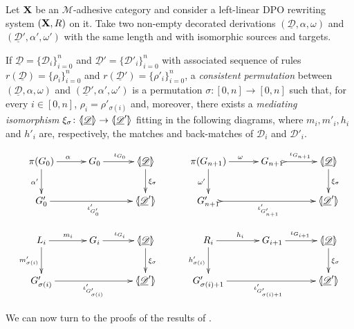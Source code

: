 \documentclass[a4paper,UKenglish,cleveref,pdftex,thm-restate,numberwithinsect,anonymous]{lipics}
\def\R{\mathsf{R}}
\def\X{\textbf {\textup{X}}}
\def\G{\textbf {\textup{G}}}
\newcommand{\dder}[1]{\mathscr{#1}}
\newcommand{\der}[1]{\underline{\dder{#1}}}
\newcommand{\lpro}{\langle \hspace{-1.85pt}[}
\newcommand{\rpro}{]\hspace{-1.85pt}\rangle}
\newcommand{\tpro}[1]{\lpro \der{#1}\rpro}
\begin{document}
\begin{definition}
	\label{def:permcon}
	Let $\X$ be an $\mathcal{M}$-adhesive category and consider a
	left-linear DPO rewriting system $(\X, \R)$ on it.  Take two
	non-empty decorated derivations $(\der{D}, \alpha, \omega)$ and
	$(\der{D}', \alpha', \omega')$ with the same length and with
	isomorphic sources and targets.
	
	If $\der{D}=\{\dder{D}_i\}_{i=0}^n$ and
	$\der{D}'=\{\dder{D}'_i\}_{i=0}^n$ with associated sequence of rules
	$r(\der{D})=\{\rho_i\}_{i=0}^n$ and
	$r(\der{D}')=\{\rho'_i\}_{i=0}^n$, a \emph{consistent permutation}
	between $(\der{D}, \alpha, \omega)$ and
	$(\der{D}', \alpha', \omega')$ is a permutation
	$\sigma\colon [0,n]\to [0,n]$ such that, for every $i\in [0,n]$,
	$\rho_i=\rho'_{\sigma(i)}$ and, moreover, there exists a
	\emph{mediating isomorphism}
	$\xi_\sigma\colon \tpro{D} \to \lpro \der{D}' \rpro$ fitting in the
	following diagrams, where $m_i, m'_i, h_i$ and $h'_i$ are,
	respectively, the matches and back-matches of $\dder{D}_i$ and
	$\dder{D}'_i$.
	
	\[
	\xymatrix@C=30pt{\pi(G_0)\ar[r]^{\alpha} \ar[d]_{\alpha'} & G_0
		\ar[r]^{\iota_{G_0}} &\tpro{D} \ar[d]^{\xi_\sigma}& \pi(G_{n+1})
		\ar[r]^{\omega} \ar[d]_{\omega'} & G_{n+1}
		\ar@{>->}[r]^{\iota_{G_{n+1}}} &\tpro{D} \ar[d]^{\xi_\sigma}\\
		G'_0 \ar[rr]_{\iota'_{G'_0}} & &\lpro \der{D}' \rpro& G'_{n+1}
		\ar@{>->}[rr]_{\iota'_{G'_{n+1}}} & &\lpro \der{D}' \rpro\\L_i
		\ar[r]^{m_i} \ar[d]_{m'_{\sigma(i)}}& G_i \ar[r]^{\iota_{G_i}}
		&\tpro{D} \ar[d]^{\xi_\sigma} & R_i \ar[r]^{h_i}
		\ar[d]_{h'_{\sigma(i)}}& G_{i+1} \ar[r]^{\iota_{G_{i+1}}}
		&\tpro{D} \ar[d]^{\xi_\sigma} \\G'_{\sigma(i)}
		\ar[rr]_{\iota'_{G'_{\sigma(i)}}}&& \lpro \der{D}' \rpro&
		G'_{\sigma(i)+1} \ar[rr]_{\iota'_{G'_{\sigma(i)+1}}}&& \lpro
		\der{D}' \rpro}
	\]
\end{definition}
We can now turn to the proofs of the results of .

\lemIndepGlobalLeft*
\label{lemIndepGlobalLeft-proof}
\end{document}
